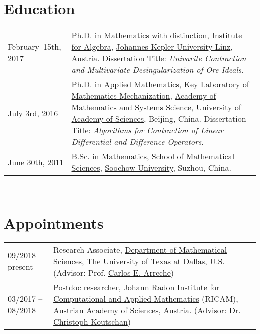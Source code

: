 \documentclass[a4paper,12pt]{article}
\begin{document}

\section*{\Large{Education}}
\begin{tabular}{@{}p{1.5in}p{4in}}
February~15th, 2017   &  Ph.D. in Mathematics with distinction, 
                        \href{http://www.jku.at/algebra/content}{Institute for Algebra}, 
                        \href{http://www.jku.at/content}{Johannes Kepler University Linz}, Austria. 
                       Dissertation Title: {\em Univarite Contraction and Multivariate Desingularization of Ore Ideals}. \\
July 3rd, 2016    & Ph.D. in Applied Mathematics, 
                        \href{http://english.mmrc.amss.cas.cn/}{Key Laboratory of Mathematics Mechanization}, 
                        \href{http://english.amss.cas.cn/}{Academy of Mathematics and Systems Science}, 
                        \href{http://english.ucas.ac.cn/}{University of Academy of Sciences}, Beijing, China. 
                       Dissertation Title: {\em Algorithms for Contraction of  Linear Differential and Difference Operators}. \\
June 30th, 2011    & B.Sc. in Mathematics, \href{http://math.suda.edu.cn/}{School of Mathematical Sciences}, 
                        \href{http://eng.suda.edu.cn/}{Soochow University}, Suzhou, China.  
\end{tabular} \\

\section*{\Large{Appointments}}
\begin{tabular}{@{}p{1.4in}p{4in}}
09/2018 -- present      & Research Associate, \href{https://www.utdallas.edu/math/}{Department of Mathematical Sciences}, 
                        \href{https://www.utdallas.edu/}{The University of Texas at Dallas}, U.S. 
                        (Advisor: Prof. \href{https://www.utdallas.edu/~arreche/}{Carlos E. Arreche}) \\    
03/2017 -- 08/2018    & Postdoc researcher, 
                        \href{https://www.ricam.oeaw.ac.at/}{Johann Radon Institute for Computational and Applied Mathematics} (RICAM),
                        \href{http://www.oeaw.ac.at/en/austrian-academy-of-sciences/}{Austrian Academy of Sciences}, Austria. 
                        (Advisor: Dr. \href{http://www.koutschan.de/}{Christoph Koutschan})\\
\end{tabular}
\end{document}
